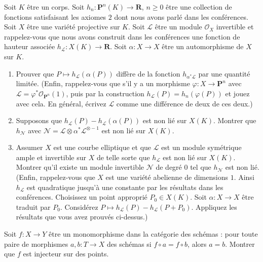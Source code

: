 \begin{exercise}[Heights]
\label{exercise-heights}
Soit $K$ être un corps. Soit $h_n : \mathbf{P}^n(K) \to \mathbf{R}$, $n \geq
0$ être une collection de fonctions satisfaisant les axiomes $2$ dont nous
avons parlé dans les conférences. Soit $X$ être une
variété projective sur $K$. Soit $\mathcal{L}$ être un module $\mathcal{O}_X$ invertible et
rappelez-vous que nous avons construit dans les conférences une fonction de
hauteur associée $h_\mathcal{L} : X(K) \to \mathbf{R}$. Soit $\alpha :
X \to X$ être un automorphisme de $X$ sur $K$.
\begin{enumerate}
\item Prouver que $P \mapsto h_\mathcal{L}(\alpha(P))$ diffère
de la fonction $h_{\alpha^*\mathcal{L}}$ par une quantité
limitée. (Enfin, rappelez-vous que s'il y a un morphisme
$\varphi : X \to
\mathbf{P}^n$ avec $\mathcal{L} = \varphi^*\mathcal{O}_{\mathbf{P}^n}(1)$, puis par la construction $h_\mathcal{L}(P) =
h_n(\varphi(P))$ et jouez avec cela. En général, écrivez
$\mathcal{L}$ comme une différence de deux de ces deux.)
\item Supposons que $h_\mathcal{L}(P) - h_\mathcal{L}(\alpha(P))$ est non
lié sur $X(K)$. Montrer
que $h_\mathcal{N}$ avec
$\mathcal{N} = \mathcal{L} \otimes \alpha^*\mathcal{L}^{\otimes -1}$ est non
lié sur $X(K)$.
\item Assumer $X$ est une courbe elliptique et
que $\mathcal{L}$ est un module symétrique ample et invertible sur
$X$ de telle sorte que $h_\mathcal{L}$ est non lié
sur $X(K)$. Montrer qu'il existe un module invertible $\mathcal{N}$ de degré $0$
tel que $h_\mathcal{N}$ est non lié. (Enfin,
rappelez-vous que $X$ est une variété abelienne de dimensions $1$. Ainsi
$h_\mathcal{L}$ est quadratique jusqu'à une constante par les résultats dans
les conférences. Choisissez un point approprié $P_0 \in X(K)$. Soit
$\alpha : X \to X$ être traduit par $P_0$.
Considérez $P \mapsto h_\mathcal{L}(P) - h_\mathcal{L}(P + P_0)$. Appliquez les
résultats que vous avez prouvés ci-dessus.)
\end{enumerate}
\end{exercise}

\begin{exercise}[Monomorphisms]
\label{exercise-monomorphisms}
Soit $f : X \to Y$ être un monomorphisme dans la catégorie des
schémas : pour toute paire de morphismes $a, b : T \to
X$ des schémas si $f \circ a = f \circ b$, alors $a
= b$. Montrer que $f$ est injecteur sur des points.
\end{exercise}

